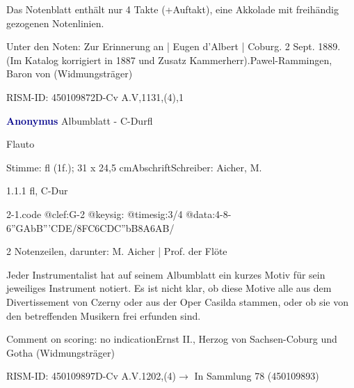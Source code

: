 \documentclass[a4paper, twocolumn, 11pt]{book}
\begin{document}
\newline %
\par Das Notenblatt enthält nur 4 Takte (+Auftakt), eine Akkolade mit freihändig gezogenen Notenlinien.
\par Unter den Noten: {\textquotedbl}Zur Erinnerung an | Eugen d'Albert | Coburg. 2 Sept. 1889.{\textquotedbl} (Im Katalog korrigiert in 1887 und Zusatz {\textquotedbl}Kammerherr{\textquotedbl}).\newline Pawel-Rammingen, Baron von  (Widmungsträger)
\par RISM-ID: 450109872\newline D-Cv  A.V,1131,(4),1
\par \vspace{16pt} \textcolor{darkblue}{\textbf{Anonymus  }}\hfillplus{[2]}\newline Albumblatt - C-Dur\newline fl
\par \begin{itshape}[heading:] Flauto\end{itshape} 
\par \textcolor{darkblue}{}  Stimme: fl  (1f.); 31 x 24,5 cm\newline Abschrift\newline Schreiber: Aicher, M.
\par 1.1.1  fl, C-Dur  
\begin{filecontents*}{2-1.code}
@clef:G-2
@keysig:
@timesig:3/4
@data:4-8-6''{GA}{bB'''CDE}/{8FC}{6CDC''bB}{8A6AB}/
\end{filecontents*}

\newline %
\par 2 Notenzeilen, darunter: M. Aicher | Prof. der Flöte
\par Jeder Instrumentalist hat auf seinem Albumblatt ein kurzes Motiv für sein jeweiliges Instrument notiert. Es ist nicht klar, ob diese Motive alle aus dem {\textquotedbl}Divertissement{\textquotedbl} von Czerny oder aus der Oper {\textquotedbl}Casilda{\textquotedbl} stammen, oder ob sie von den betreffenden Musikern frei erfunden sind.
\par Comment on scoring: no indication\newline Ernst II., Herzog von Sachsen-Coburg und Gotha  (Widmungsträger)
\par RISM-ID: 450109897\newline D-Cv  A.V.1202,(4)\newline $\rightarrow$ In Sammlung 78 (450109893)
      
\end{document}
